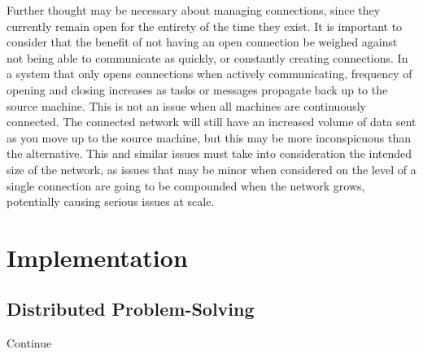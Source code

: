 Further thought may be necessary about managing connections, since they currently remain open for the entirety of the time they exist. It is important to consider that the benefit of not having an open connection be weighed against not being able to communicate as quickly, or constantly creating connections. In a system that only opens connections when actively communicating, frequency of opening and closing increases as tasks or messages propagate back up to the source machine. This is not an issue when all machines are continuously connected. The connected network will still have an increased volume of data sent as you move up to the source machine, but this may be more inconspicuous than the alternative. This and similar issues must take into consideration the intended size of the network, as issues that may be minor when considered on the level of a single connection are going to be compounded when the network grows, potentially causing serious issues at scale.
\section{Implementation}
\subsection{Distributed Problem-Solving}
Continue
